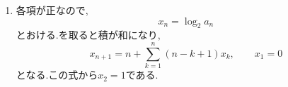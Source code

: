 \begin{enumerate}[label=\textbf{問\arabic*.},leftmargin=3.8em,format=\bookitemlink{practice-advanced}{solution}{problem}]
    \noindent \textbf{【別解】}\\
    $b_n$の式を$2^n$で割ると,
    \[
      \frac{b_{n+1}}{2^n}
      -\frac{b_n}{2^{n-1}}=\frac{n}{2^n}.
    \]
    したがって
    \[
      \frac{b_n}{2^{n-1}}
      =1+\sum_{k=1}^{n-1}\frac{k}{2^k}.
    \]
    ここで
    \[
      \frac{k}{2^k}
      =\frac{k+1}{2^{k-1}}-\frac{k+2}{2^k}
    \]
    だから総和は相殺し,
    \[
      \sum_{k=1}^{n-1}\frac{k}{2^k}
      =2-\frac{n+1}{2^{n-1}}.
    \]
    これから同じ$b_n$を得る.一次式を加える解法は,この相殺をの形で先に組み込んだものといえる.
  \item 各項が正なので,
    \[
      x_n=\log_2a_n
    \]
    とおける.を取ると積が和になり,
    \[
      x_{n+1}
      =n+\sum_{k=1}^{n}(n-k+1)x_k,
      \qquad x_1=0
    \]
    となる.この式から$x_2=1$である.


\end{enumerate}

